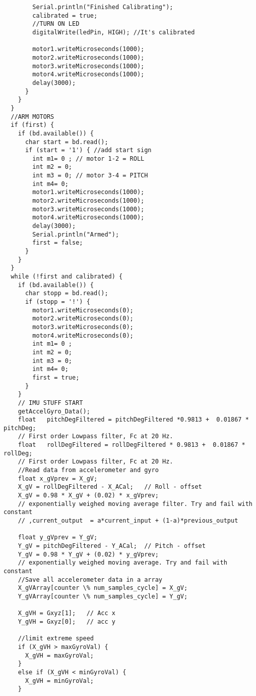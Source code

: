 \begin{lstlisting}
        Serial.println("Finished Calibrating");
        calibrated = true;
        //TURN ON LED
        digitalWrite(ledPin, HIGH); //It's calibrated
 
        motor1.writeMicroseconds(1000);
        motor2.writeMicroseconds(1000);
        motor3.writeMicroseconds(1000);
        motor4.writeMicroseconds(1000);
        delay(3000);
      }
    }
  }
  //ARM MOTORS
  if (first) {
    if (bd.available()) {
      char start = bd.read();
      if (start = '1') { //add start sign
        int m1= 0 ; // motor 1-2 = ROLL
        int m2 = 0;
        int m3 = 0; // motor 3-4 = PITCH
        int m4= 0;
        motor1.writeMicroseconds(1000);
        motor2.writeMicroseconds(1000);
        motor3.writeMicroseconds(1000);
        motor4.writeMicroseconds(1000);
        delay(3000);
        Serial.println("Armed");
        first = false;
      }
    }
  }
  while (!first and calibrated) {
    if (bd.available()) {
      char stopp = bd.read();
      if (stopp = '!') {
        motor1.writeMicroseconds(0);
        motor2.writeMicroseconds(0);
        motor3.writeMicroseconds(0);
        motor4.writeMicroseconds(0);
        int m1= 0 ;
        int m2 = 0;
        int m3 = 0;
        int m4= 0;
        first = true;
      }
    }
    // IMU STUFF START
    getAccelGyro_Data();
    float   pitchDegFiltered = pitchDegFiltered *0.9813 +  0.01867 * pitchDeg; 
    // First order Lowpass filter, Fc at 20 Hz.
    float   rollDegFiltered = rollDegFiltered * 0.9813 +  0.01867 * rollDeg;  
    // First order Lowpass filter, Fc at 20 Hz.
    //Read data from accelerometer and gyro
    float x_gVprev = X_gV;
    X_gV = rollDegFiltered - X_ACal;   // Roll - offset
    X_gV = 0.98 * X_gV + (0.02) * x_gVprev; 
    // exponentially weighed moving average filter. Try and fail with constant
    // ,current_output  = a*current_input + (1-a)*previous_output
 
    float y_gVprev = Y_gV;
    Y_gV = pitchDegFiltered - Y_ACal;  // Pitch - offset
    Y_gV = 0.98 * Y_gV + (0.02) * y_gVprev; 
    // exponentially weighed moving average. Try and fail with constant
    //Save all accelerometer data in a array
    X_gVArray[counter \% num_samples_cycle] = X_gV;
    Y_gVArray[counter \% num_samples_cycle] = Y_gV;
 
    X_gVH = Gxyz[1];   // Acc x
    Y_gVH = Gxyz[0];   // acc y
 
    //limit extreme speed
    if (X_gVH > maxGyroVal) {
      X_gVH = maxGyroVal;
    }
    else if (X_gVH < minGyroVal) {
      X_gVH = minGyroVal;
    }
 

\end{lstlisting}
